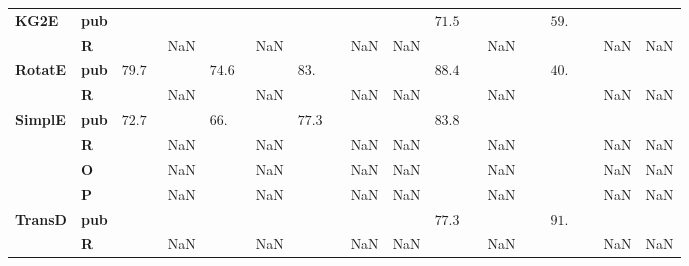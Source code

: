 \begin{tabular}{llrrrrrrr}
\textbf{KG2E} & \textbf{pub} &                             &                             &                              &             &  $71.5\phantom{0 \pm 00.00}$ &  $\phantom{000}59.\phantom{00 \pm 00.00}$ &          \\
       & \textbf{R} &                         NaN &                         NaN &                          NaN &         NaN &                          NaN &                                       NaN &      NaN \\\midrule
\textbf{RotatE} & \textbf{pub} &  $79.7\phantom{0 \pm 0.00}$ &  $74.6\phantom{0 \pm 0.00}$ &  $83.\phantom{00 \pm 00.00}$ &             &  $88.4\phantom{0 \pm 00.00}$ &  $\phantom{000}40.\phantom{00 \pm 00.00}$ &          \\
       & \textbf{R} &                         NaN &                         NaN &                          NaN &         NaN &                          NaN &                                       NaN &      NaN \\\midrule
\textbf{SimplE} & \textbf{pub} &  $72.7\phantom{0 \pm 0.00}$ &  $66.\phantom{00 \pm 0.00}$ &  $77.3\phantom{0 \pm 00.00}$ &             &  $83.8\phantom{0 \pm 00.00}$ &                                           &          \\
       & \textbf{R} &                         NaN &                         NaN &                          NaN &         NaN &                          NaN &                                       NaN &      NaN \\
       & \textbf{O} &                         NaN &                         NaN &                          NaN &         NaN &                          NaN &                                       NaN &      NaN \\
       & \textbf{P} &                         NaN &                         NaN &                          NaN &         NaN &                          NaN &                                       NaN &      NaN \\\midrule
\textbf{TransD} & \textbf{pub} &                             &                             &                              &             &  $77.3\phantom{0 \pm 00.00}$ &  $\phantom{000}91.\phantom{00 \pm 00.00}$ &          \\
       & \textbf{R} &                         NaN &                         NaN &                          NaN &         NaN &                          NaN &                                       NaN &      NaN \\\midrule

\end{tabular}
